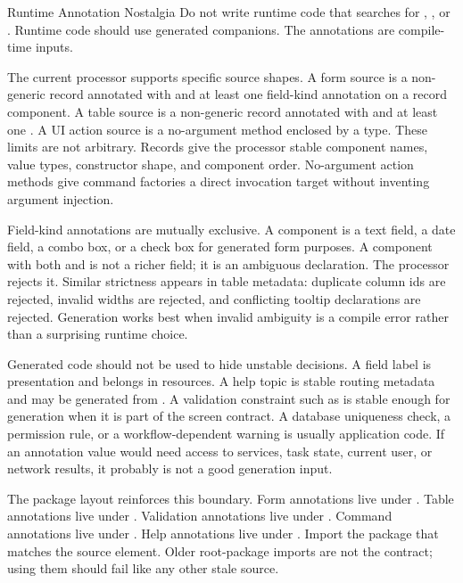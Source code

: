 \begin{pitfallbox}{Runtime Annotation Nostalgia}
Do not write runtime code that searches for ,
, or . Runtime code should use generated
companions. The annotations are compile-time inputs.
\end{pitfallbox}

The current processor supports specific source shapes. A form source is a
non-generic record annotated with  and at least one field-kind
annotation on a record component. A table source is a non-generic record
annotated with  and at least one . A UI action
source is a no-argument  method enclosed by a type. These limits are
not arbitrary. Records give the processor stable component names, value types,
constructor shape, and component order. No-argument action methods give command
factories a direct invocation target without inventing argument injection.

Field-kind annotations are mutually exclusive. A component is a text field, a
date field, a combo box, or a check box for generated form purposes. A
component with both  and  is not a richer field;
it is an ambiguous declaration. The processor rejects it. Similar strictness
appears in table metadata: duplicate column ids are rejected, invalid widths
are rejected, and conflicting tooltip declarations are rejected. Generation
works best when invalid ambiguity is a compile error rather than a surprising
runtime choice.

Generated code should not be used to hide unstable decisions. A field label is
presentation and belongs in resources. A help topic is stable routing metadata
and may be generated from . A validation constraint such as
 is stable enough for generation when it is part of the
screen contract. A database uniqueness check, a permission rule, or a
workflow-dependent warning is usually application code. If an annotation value
would need access to services, task state, current user, or network results, it
probably is not a good generation input.

The package layout reinforces this boundary. Form annotations live under
. Table annotations live under
. Validation annotations live under
. Command annotations live
under . Help annotations live under
. Import the package that matches the
source element. Older root-package imports are not the contract; using them
should fail like any other stale source.

